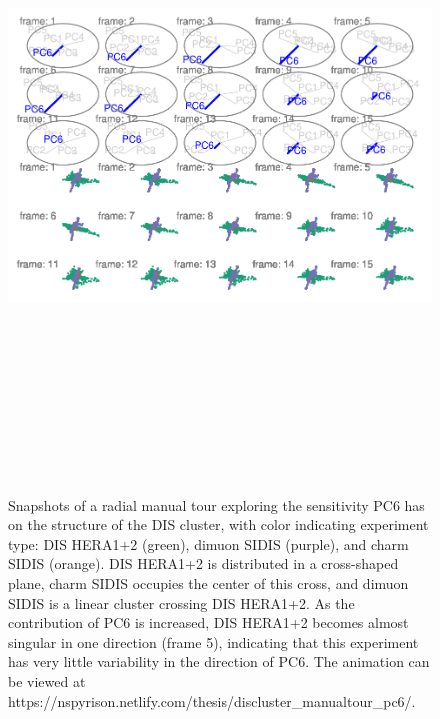 \begin{Schunk}
\begin{figure}

{\centering \includegraphics[width=5.83in,height=7in]{spyrison-cook_files/figure-latex/DISclusterGood-1} 

}

\caption[Snapshots of a radial manual tour exploring the sensitivity PC6 has on the structure of the DIS cluster, with color indicating experiment type]{Snapshots of a radial manual tour exploring the sensitivity PC6 has on the structure of the DIS cluster, with color indicating experiment type: DIS HERA1+2 (green), dimuon SIDIS (purple), and charm SIDIS (orange). DIS HERA1+2 is distributed in a cross-shaped plane, charm SIDIS occupies the center of this cross, and dimuon SIDIS is a linear cluster crossing DIS HERA1+2. As the contribution of PC6 is increased, DIS HERA1+2 becomes almost singular in one direction (frame 5), indicating that this experiment has very little variability in the direction of PC6. The animation can be viewed at https://nspyrison.netlify.com/thesis/discluster\_manualtour\_pc6/.}\label{fig:DISclusterGood}
\end{figure}
\end{Schunk}

